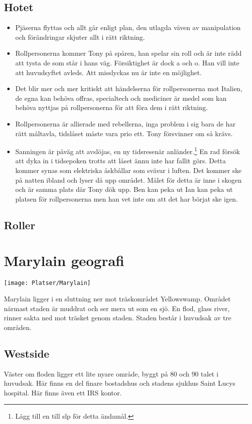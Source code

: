 \documentclass[a5paper,10pt]{report}
\begin{document}
\subsection{Hotet}
\begin{itemize}
  \item[Låg] Pjäserna flyttas och allt går enligt plan, den utlagda väven av manipulation och förändringar skjuter allt i rätt riktning.
  \item[1:a växeln] Rollpersonerna kommer Tony på spåren, han spelar sin roll och är inte rädd att tysta de som står i hans väg. Försiktighet är dock a och o. Han vill inte att huvudsyftet avleds. Att misslyckas nu är inte en möjlighet.
  \item[2:a växeln] Det blir mer och mer kritiskt att händelserna för rollpersonerna mot Italien, de egna kan behöva offras, specialtech och mediciner är medel som kan behöva nyttjas på rollpersonerna för att föra dem i rätt riktning.
  \item[3:e växeln] Rollpersonerna är allierade med rebellerna, inga problem i sig bara de har rätt måltavla, tidslåset måste vara prio ett. Tony försvinner om så krävs.
  \item[Overdrive] Sanningen är påväg att avslöjas, en ny tidsresenär anländer.\footnote{Lägg till en till slp för detta ändamål.} En rad försök att dyka in i tidsepoken trotts att låset ännu inte har fallit görs. Detta kommer synas som elektriska åskbållar som svävar i luften. Det kommer ske på natten ibland och lyser då upp området. Målet för detta är inne i skogen och är samma plats där Tony dök upp. Ben kan peka ut Ian kan peka ut platsen för rollpersonerna men han vet inte om att det har börjat ske igen.
\end{itemize}
\subsection{Roller}


\section{Marylain geografi}
\texttt{[image: Platser/Marylain]}

Marylain ligger i en sluttning ner mot träskområdet Yellowswamp. Området närmast staden är muddrat och ser mera ut som en sjö. En flod, glass river, rinner sakta ned mot träsket genom staden. Staden består i huvudsak av tre områden.
\subsection{Westside}
Väster om floden ligger ett lite nyare område, byggt på 80 och 90 talet i huvudsak. Här finns en del finare bostadshus och stadens sjukhus Saint Lucys hospital. Här finns även ett IRS kontor.
\end{document}

